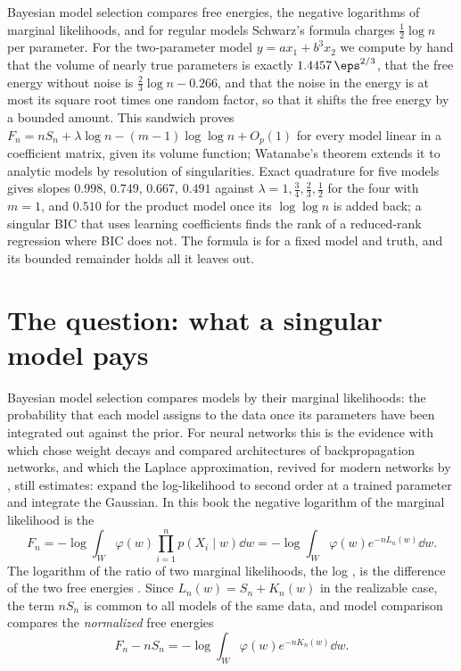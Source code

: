 \begin{refsection}

\begin{chaptersummary}
Bayesian model selection compares free energies, the negative logarithms of marginal likelihoods, and for regular models Schwarz's formula charges $\tfrac12\log n$ per parameter. For the two-parameter model $y=ax_1+b^3x_2$ we compute by hand that the volume of nearly true parameters is exactly $1.4457\,\eps^{2/3}$, that the free energy without noise is $\tfrac23\log n-0.266$, and that the noise in the energy is at most its square root times one random factor, so that it shifts the free energy by a bounded amount. This sandwich proves $F_n=nS_n+\lambda\log n-(m-1)\log\log n+O_p(1)$ for every model linear in a coefficient matrix, given its volume function; Watanabe's theorem extends it to analytic models by resolution of singularities. Exact quadrature for five models gives slopes $0.998$, $0.749$, $0.667$, $0.491$ against $\lambda=1,\tfrac34,\tfrac23,\tfrac12$ for the four with $m=1$, and $0.510$ for the product model once its $\log\log n$ is added back; a singular BIC that uses learning coefficients finds the rank of a reduced-rank regression where BIC does not. The formula is for a fixed model and truth, and its bounded remainder holds all it leaves out.
\end{chaptersummary}

\section{The question: what a singular model pays}\label{sec:freeenergy:question}

Bayesian model selection compares models by their marginal likelihoods: the probability that each model assigns to the data once its parameters have been integrated out against the prior. For neural networks this is the evidence with which \textcite{MacKay1992} chose weight decays and compared architectures of backpropagation networks, and which the Laplace approximation, revived for modern networks by \textcite{DaxbergerEtAl2021}, still estimates: expand the log-likelihood to second order at a trained parameter and integrate the Gaussian. In this book the negative logarithm of the marginal likelihood is the 
\[
F_n=-\log\int_W\varphi(w)\prod_{i=1}^np(X_i\mid w)\dd w=-\log\int_W\varphi(w)e^{-nL_n(w)}\dd w .
\]
The logarithm of the ratio of two marginal likelihoods, the log , is the difference of the two free energies \parencite{KassRaftery1995}. Since $L_n(w)=S_n+K_n(w)$ in the realizable case, the term $nS_n$ is common to all models of the same data, and model comparison compares the \emph{normalized} free energies
\[
F_n-nS_n=-\log\int_W\varphi(w)e^{-nK_n(w)}\dd w .
\]


\end{refsection}
